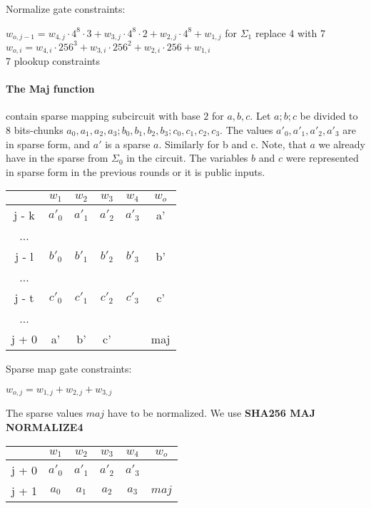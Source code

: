 Normalize gate constraints:
\begin{center}
    $w_{o,j-1} = w_{4,j} \cdot 4^8 \cdot 3 + w_{3,j} \cdot 4^8 \cdot 2 + w_{2,j} \cdot 4^8 + w_{1,j}$ for $\Sigma_1$ replace 4 with 7\\
    $w_{o,i} = w_{4,i} \cdot 256^3 + w_{3,i} \cdot 256^2 + w_{2,i} \cdot 256 + w_{1,i}$ \\
    7 plookup constraints \\
\end{center}

\paragraph{The Maj function}
contain sparse mapping subcircuit with base $2$ for $a, b ,c$.
Let $a; b; c$ be divided to 8 bits-chunks $a_0, a_1, a_2, a_3; b_0, b_1, b_2, b_3; c_0, c_1, c_2, c_3$.
The values $a'_0, a'_1, a'_2, a'_3$ are in sparse form, and $a'$ is a sparse $a$.
Similarly for b and c.
Note, that $a$ we already have in the sparse from $\Sigma_0$ in the circuit.
The variables $b$ and $c$ were represented in sparse form in the previous rounds or it is public inputs.
\begin{center}
    \begin{tabular}{ c|c|c|c|c|c }
        & $w_1$  & $w_2$  & $w_3$  & $w_4$  & $w_o$ \\
        \hline
        j - k & $a'_0$ & $a'_1$ & $a'_2$ & $a'_3$ & a'    \\
        ... & & & & \\
        j - l & $b'_0$ & $b'_1$ & $b'_2$ & $b'_3$ & b'    \\
        ... & & & & \\
        j - t & $c'_0$ & $c'_1$ & $c'_2$ & $c'_3$ & c'    \\
        ... & & & & \\
        j + 0 & a'     & b'     & c'     &        & maj   \\
    \end{tabular}
\end{center}
Sparse map gate constraints:
\begin{center}
    $w_{o, j} = w_{1,j} + w_{2, j} + w_{3, j}$ \\
\end{center}

The sparse values $maj$ have to be normalized.
We use \textbf{SHA256 MAJ NORMALIZE4}
\begin{center}
    \begin{tabular}{ c|c|c|c|c|c }
        & $w_1$  & $w_2$  & $w_3$  & $w_4$  & $w_o$ \\
        \hline
        j + 0 & $a'_0$ & $a'_1$ & $a'_2$ & $a'_3$ &       \\
        j + 1 & $a_0$  & $ a_1$ & $a_2$  & $a_3$  & $maj$ \\
    \end{tabular}
\end{center}

